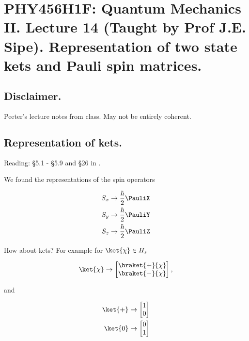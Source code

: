 
%

\chapter{PHY456H1F: Quantum Mechanics II.  Lecture 14 (Taught by Prof J.E. Sipe).  Representation of two state kets and Pauli spin matrices.}
\label{chap:qmTwoL14}
{}
\date{Oct 26, 2011}

\beginArtWithToc

\section{Disclaimer.}

Peeter's lecture notes from class.  May not be entirely coherent.

\section{Representation of kets.}

Reading: \S 5.1 - \S 5.9 and \S 26 in \cite{desai2009quantum}.

We found the representations of the spin operators

\begin{align}\label{eqn:qmTwoL14:10}
S_x &\rightarrow \frac{\hbar}{2} \PauliX \\
S_y &\rightarrow \frac{\hbar}{2} \PauliY \\
S_z &\rightarrow \frac{\hbar}{2} \PauliZ
\end{align}

How about kets?  For example for $\ket{\chi} \in H_s$

\begin{equation}\label{eqn:qmTwoL14:30}
\ket{\chi} \rightarrow 
\begin{bmatrix}
\braket{+}{\chi} \\
\braket{-}{\chi}
\end{bmatrix},
\end{equation}

and 

\begin{align}\label{eqn:qmTwoL14:640}
\ket{+} &\rightarrow 
\begin{bmatrix}
1 \\
0
\end{bmatrix} \\
\ket{0} &\rightarrow 
\begin{bmatrix}
0 \\
1
\end{bmatrix}
\end{align}


